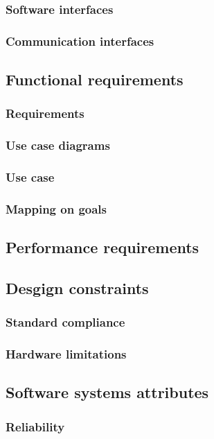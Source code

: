 \documentclass[11pt,twoside]{article}
\begin{document}
\subsubsection{Software interfaces}
\subsubsection{Communication interfaces}

\subsection{Functional requirements}

\subsubsection{Requirements}
\subsubsection{Use case diagrams}
\subsubsection{Use case}
\subsubsection{Mapping on goals}

\subsection{Performance requirements}
\subsection{Desgign constraints}

\subsubsection{Standard compliance}
\subsubsection{Hardware limitations}

\subsection{Software systems attributes}
\subsubsection{Reliability}
\end{document}
